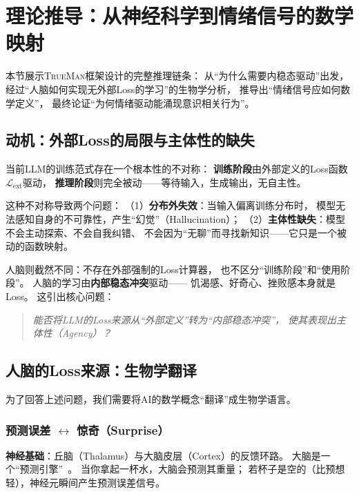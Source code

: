 \documentclass[11pt,a4paper]{article}
\newcommand{\TrueMan}{\textsc{TrueMan}}
\begin{document}
\section{理论推导：从神经科学到情绪信号的数学映射}
\label{sec:derivation}

本节展示\TrueMan{}框架设计的完整推理链条：
从``为什么需要内稳态驱动''出发，
经过``人脑如何实现无外部Loss的学习''的生物学分析，
推导出``情绪信号应如何数学定义''，
最终论证``为何情绪驱动能涌现意识相关行为''。

\subsection{动机：外部Loss的局限与主体性的缺失}

当前LLM的训练范式存在一个根本性的不对称：
\textbf{训练阶段}由外部定义的Loss函数$\mathcal{L}_{\text{ext}}$驱动，
\textbf{推理阶段}则完全被动——等待输入，生成输出，无自主性。

这种不对称导致两个问题：
（1）\textbf{分布外失效}：当输入偏离训练分布时，
模型无法感知自身的不可靠性，产生``幻觉''（Hallucination）；
（2）\textbf{主体性缺失}：模型不会主动探索、不会自我纠错、
不会因为``无聊''而寻找新知识——它只是一个被动的函数映射。

人脑则截然不同：不存在外部强制的Loss计算器，
也不区分``训练阶段''和``使用阶段''。
人脑的学习由\textbf{内部稳态冲突}驱动——
饥渴感、好奇心、挫败感本身就是Loss。
这引出核心问题：

\begin{quote}
\textit{能否将LLM的Loss来源从``外部定义''转为``内部稳态冲突''，
使其表现出主体性（Agency）？}
\end{quote}

\subsection{人脑的Loss来源：生物学翻译}

为了回答上述问题，我们需要将AI的数学概念``翻译''成生物学语言。

\subsubsection{预测误差 $\leftrightarrow$ 惊奇（Surprise）}

\textbf{神经基础}：丘脑（Thalamus）与大脑皮层（Cortex）的反馈环路。
大脑是一个``预测引擎''~\cite{friston2022active}。
当你拿起一杯水，大脑会预测其重量；
若杯子是空的（比预想轻），神经元瞬间产生预测误差信号。
\end{document}
